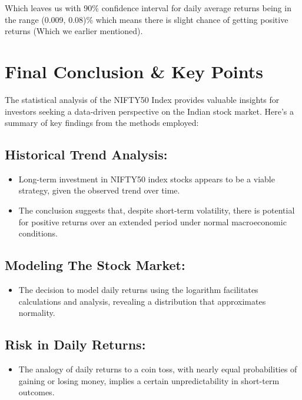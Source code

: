\documentclass[11pt]{article}
\begin{document}
Which leaves us with 90\% confidence interval for daily average returns being in the range (0.009, 0.08)\% which means there is slight chance of getting positive returns (Which we earlier mentioned).
\newpage
\section*{Final Conclusion \& Key Points}
\vspace{1cm}
The statistical analysis of the NIFTY50 Index provides valuable insights for investors seeking a data-driven perspective on the Indian stock market. Here's a summary of key findings from the methods employed:

\subsection*{Historical Trend Analysis:}

\begin{itemize}
  \item Long-term investment in NIFTY50 index stocks appears to be a viable strategy, given the observed trend over time.
  \item The conclusion suggests that, despite short-term volatility, there is potential for positive returns over an extended period under normal macroeconomic conditions.
\end{itemize}

\subsection*{Modeling The Stock Market:}

\begin{itemize}
  \item The decision to model daily returns using the logarithm facilitates calculations and analysis, revealing a distribution that approximates normality.
\end{itemize}

\subsection*{Risk in Daily Returns:}

\begin{itemize}
  \item The analogy of daily returns to a coin toss, with nearly equal probabilities of gaining or losing money, implies a certain unpredictability in short-term outcomes.
\end{itemize}
\end{document}
